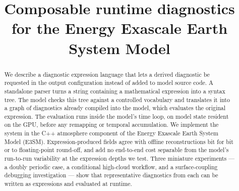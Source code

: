 \documentclass[gmd, manuscript]{copernicus}
\begin{document}
\title{Composable runtime diagnostics for the Energy Exascale Earth System Model}







\received{}
\pubdiscuss{} %
\revised{}
\accepted{}
\published{}
\maketitle


\begin{abstract}
We describe a diagnostic expression language that lets a derived diagnostic be requested in the output configuration instead of added to model source code. A standalone parser turns a string containing a mathematical expression into a syntax tree. The model checks this tree against a controlled vocabulary and translates it into a graph of diagnostics already compiled into the model, which evaluates the original expression. The evaluation runs inside the model's time loop, on model state resident on the GPU, before any remapping or temporal accumulation. We implement the system in the C++ atmosphere component of the Energy Exascale Earth System Model (E3SM). Expression-produced fields agree with offline reconstructions bit for bit or to floating-point round-off, and add no end-to-end cost separable from the model's run-to-run variability at the expression depths we test. Three miniature experiments --- a doubly periodic case, a conditional high-cloud workflow, and a surface-coupling debugging investigation --- show that representative diagnostics from each can be written as expressions and evaluated at runtime.
\end{abstract}
\end{document}
